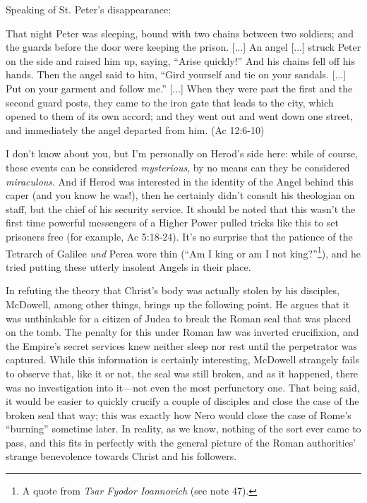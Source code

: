 Speaking of St. Peter's disappearance:

\begin{smallquote}
    That night Peter was sleeping, bound with two chains between two soldiers; and the guards before the door were keeping the prison. [...] An angel [...] struck Peter on the side and raised him up, saying, ``Arise quickly!'' And his chains fell off his hands. Then the angel said to him, ``Gird yourself and tie on your sandals. [...] Put on your garment and follow me.'' [...] When they were past the first and the second guard posts, they came to the iron gate that leads to the city, which opened to them of its own accord; and they went out and went down one street, and immediately the angel departed from him. (Ac 12:6-10)
\end{smallquote}
I don't know about you, but I'm personally on Herod's side here: while of course, these events can be considered \emph{mysterious}, by no means can they be considered \emph{miraculous}. And if Herod was interested in the identity of the Angel behind this caper (and you know he was!), then he certainly didn't consult his theologian on staff, but the chief of his security service. It should be noted that this wasn't the first time powerful messengers of a Higher Power pulled tricks like this to set prisoners free (for example, Ac 5:18-24). It's no surprise that the patience of the Tetrarch of Galilee \emph{und} Perea wore thin (``Am I king or am I not king?''\footnote{A quote from \emph{Tsar Fyodor Ioannovich} (see note 47).}), and he tried putting these utterly insolent Angels in their place.

In refuting the theory that Christ's body was actually stolen by his disciples, McDowell, among other things, brings up the following point. He argues that it was unthinkable for a citizen of Judea to break the Roman seal that was placed on the tomb. The penalty for this under Roman law was inverted crucifixion, and the Empire's secret services knew neither sleep nor rest until the perpetrator was captured. While this information is certainly interesting, McDowell strangely fails to observe that, like it or not, the seal was still broken, and as it happened, there was no investigation into it---not even the most perfunctory one. That being said, it would be easier to quickly crucify a couple of disciples and close the case of the broken seal that way; this was exactly how Nero would close the case of Rome's ``burning'' sometime later. In reality, as we know, nothing of the sort ever came to pass, and this fits in perfectly with the general picture of the Roman authorities' strange benevolence towards Christ and his followers.


